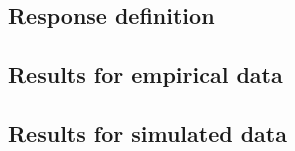 \chapter{}\label{ch:pytepfit}

\section{Response definition}

\section{Results for empirical data}

\section{Results for simulated data}
